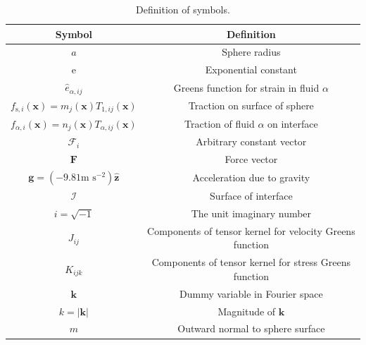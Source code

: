 \documentclass[12pt]{article}
\begin{document}
    \begin{longtable}{|c|c|}
    \caption{Definition of symbols. \label{tab:symbols}} \\ %
    \hline
    Symbol & Definition \\  
    \hline %
    $a$                                                                           & Sphere radius           \\
    $\mathrm{e}$                                                                  & Exponential constant \\
    $\hat{e}_{\alpha,ij}$                                                           & Greens function for strain in fluid $\alpha$ \\
    $f_{\text{s},i}(\boldsymbol{x}) = m_{j}(\boldsymbol{x})T_{1,ij}(\boldsymbol{x})$   &Traction on surface of sphere \\
    $f_{\alpha,i}(\boldsymbol{x}) = n_{j}(\boldsymbol{x})T_{\alpha,ij}(\boldsymbol{x})$ & Traction of fluid $\alpha$ on interface \\
    $\mathcal{F}_{i}$                                                              & Arbitrary constant vector \\
    $\boldsymbol{F}$                                                              & Force vector \\
    $\boldsymbol{g} = (-9.81 \text{m s}^{-2}) \boldsymbol{\hat{z}}$                & Acceleration due to gravity \\      
    $\mathcal{I}$                                                                 & Surface of interface \\
    $i = \sqrt{-1}$                                                               & The unit imaginary number \\
    $J_{ij}$                                                                       & Components of tensor kernel for velocity Greens function \\
    $K_{ijk}$                                                                     & Components of tensor kernel for stress Greens function \\
    $\boldsymbol{k}$                                                              & Dummy variable in Fourier space \\
    $k = |\boldsymbol{k}|$                                                        & Magnitude of $\boldsymbol{k}$ \\
    $m$                                                                           & Outward normal to sphere surface \\

\end{longtable}
\end{document}
